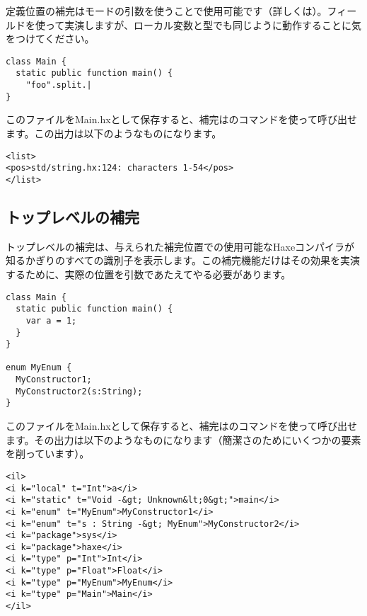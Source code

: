 定義位置の補完はモードの引数を使うことで使用可能です（詳しくは）。フィールドを使って実演しますが、ローカル変数と型でも同じように動作することに気をつけてください。

\begin{lstlisting}
class Main {
  static public function main() {
    "foo".split.|
}
\end{lstlisting}

このファイルをMain.hxとして保存すると、補完はのコマンドを使って呼び出せます。この出力は以下のようなものになります。

\begin{lstlisting}
<list>
<pos>std/string.hx:124: characters 1-54</pos>
</list>
\end{lstlisting}


\subsection{トップレベルの補完}
\label{cr-completion-top-level}

トップレベルの補完は、与えられた補完位置での使用可能なHaxeコンパイラが知るかぎりのすべての識別子を表示します。この補完機能だけはその効果を実演するために、実際の位置を引数であたえてやる必要があります。

\begin{lstlisting}
class Main {
  static public function main() {
    var a = 1;
  }
}

enum MyEnum {
  MyConstructor1;
  MyConstructor2(s:String);
}
\end{lstlisting}

このファイルをMain.hxとして保存すると、補完はのコマンドを使って呼び出せます。その出力は以下のようなものになります（簡潔さのためにいくつかの要素を削っています）。

\begin{lstlisting}
<il>
<i k="local" t="Int">a</i>
<i k="static" t="Void -&gt; Unknown&lt;0&gt;">main</i>
<i k="enum" t="MyEnum">MyConstructor1</i>
<i k="enum" t="s : String -&gt; MyEnum">MyConstructor2</i>
<i k="package">sys</i>
<i k="package">haxe</i>
<i k="type" p="Int">Int</i>
<i k="type" p="Float">Float</i>
<i k="type" p="MyEnum">MyEnum</i>
<i k="type" p="Main">Main</i>
</il>
\end{lstlisting}

